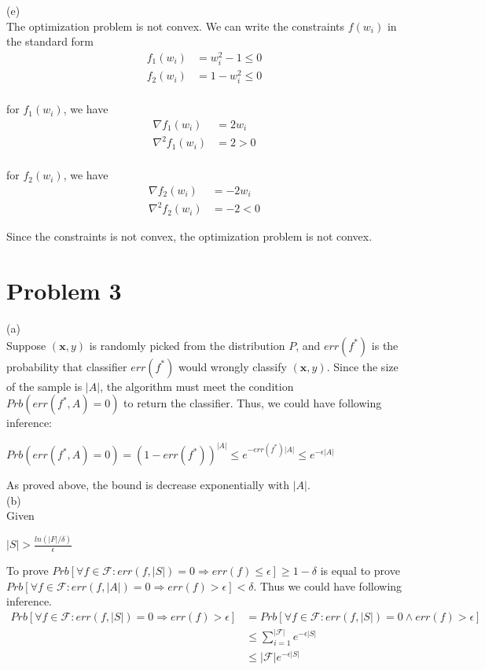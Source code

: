 \documentclass[twoside,11pt]{homework}
\begin{document}
(e) \\ \indent 
The optimization problem is not convex. We can write the constraints $f(w_i)$  in the standard form\\
\begin{align*}
f_1(w_i)  &= w_i^2 - 1 \leq 0\\
f_2(w_i)  &= 1 - w_i^2 \leq 0\\ 
\end{align*}

for $f_1(w_i)$, we have \\
\begin{align*}
\nabla f_1(w_i)  &= 2 w_i\\
\nabla^2 f_1(w_i)  &= 2 > 0
\end{align*}
\\
for $f_2(w_i)$, we have \\
\begin{align*}
\nabla f_2(w_i)  &= -2 w_i\\
\nabla^2 f_2(w_i)  &= -2 < 0
\end{align*}

Since the constraints is not convex, the optimization problem is not convex. 



\section*{Problem 3}
(a) \indent \\ \indent
Suppose $(\pmb x, y)$ is randomly picked from the distribution $P$, and $err(f^*)$ is the probability that classifier $err(f^*)$ would wrongly classify $(\pmb x, y)$. Since the size of the sample is $|A|$, the algorithm must meet the condition $Prb(err(f^*, A) =0)$ to return the classifier. Thus, we could have following inference: \\
\begin{center}
$Prb(err(f^*, A) = 0) = (1-err(f^*))^{|A|} \leq e^ {-err(f^*)|A|}\leq e^{-\epsilon |A|} $
\end{center}
As proved above, the bound is decrease exponentially with $|A|$. \\

(b) \indent \\ \indent
Given \\
\begin{center}
$|S| > \frac{ln(|F|/\delta)}{\epsilon}$\\
\end{center}
\indent
To prove $Prb[\forall f \in \mathcal{F}: err(f,|S|) = 0 \Rightarrow err(f) \leq \epsilon] \geq 1-\delta$ is equal to prove $Prb[\forall f \in  \mathcal{F}: err(f,|A|) = 0 \Rightarrow err(f) > \epsilon] < \delta$. Thus we could have following inference. \\
\begin{align*}
Prb[\forall f \in  \mathcal{F}: err(f,|S|) = 0 \Rightarrow err(f) > \epsilon] &= Prb[\forall f \in \mathcal{F}: err(f,|S|) = 0  \wedge err(f) > \epsilon] \\
&\leq \sum_{i=1}^{|\mathcal{F}|}e^{-\epsilon |S|} \\
&\leq|\mathcal{F}|e^{-\epsilon |S|}
\end{align*}
\end{document}
